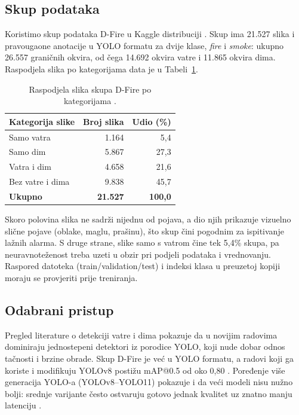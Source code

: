 \subsection{Skup podataka}
Koristimo skup podataka D-Fire \cite{dfire} u Kaggle distribuciji \cite{kaggle}. Skup ima 21.527 slika i pravougaone anotacije u YOLO formatu za dvije klase, \emph{fire} i \emph{smoke}: ukupno 26.557 graničnih okvira, od čega 14.692 okvira vatre i 11.865 okvira dima. Raspodjela slika po kategorijama data je u Tabeli~\ref{tab:dfire}.

\begin{table}[H]
\centering
\small
\begin{tabular}{@{}lrr@{}}
\toprule
\textbf{Kategorija slike} & \textbf{Broj slika} & \textbf{Udio (\%)}\\
\midrule
Samo vatra & 1.164 & 5,4\\
Samo dim & 5.867 & 27,3\\
Vatra i dim & 4.658 & 21,6\\
Bez vatre i dima & 9.838 & 45,7\\
\midrule
\textbf{Ukupno} & \textbf{21.527} & \textbf{100,0}\\
\bottomrule
\end{tabular}
\caption{Raspodjela slika skupa D-Fire po kategorijama \cite{dfire}.}
\label{tab:dfire}
\end{table}

Skoro polovina slika ne sadrži nijednu od pojava, a dio njih prikazuje vizuelno slične pojave (oblake, maglu, prašinu), što skup čini pogodnim za ispitivanje lažnih alarma. S druge strane, slike samo s vatrom čine tek 5,4\% skupa, pa neuravnoteženost treba uzeti u obzir pri podjeli podataka i vrednovanju. Raspored datoteka (train/validation/test) i indeksi klasa u preuzetoj kopiji moraju se provjeriti prije treniranja.

\subsection{Odabrani pristup}
Pregled literature o detekciji vatre i dima pokazuje da u novijim radovima dominiraju jednostepeni detektori iz porodice YOLO, koji nude dobar odnos tačnosti i brzine obrade. Skup D-Fire je već u YOLO formatu, a radovi koji ga koriste i modifikuju YOLOv8 postižu mAP@0.5 od oko 0,80 \cite{ligsf,liyologx}. Poređenje više generacija YOLO-a (YOLOv8--YOLO11) pokazuje i da veći modeli nisu nužno bolji: srednje varijante često ostvaruju gotovo jednak kvalitet uz znatno manju latenciju \cite{ramos}.

